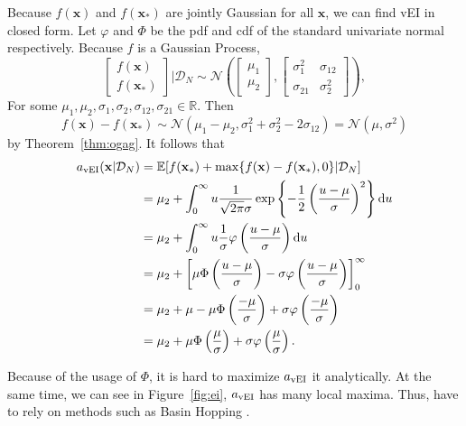 Because $f(\mathbf{x})$ and $f(\mathbf{x}_*)$ are jointly Gaussian for all $\mathbf{x}$, we can find vEI in closed form.
Let $\varphi$ and $\Phi$ be the pdf and cdf of the standard univariate normal respectively. 
Because $f$ is a Gaussian Process,
\begin{equation*}
    \begin{bmatrix}
        f(\mathbf{x}) \\
        f(\mathbf{x}_*)
    \end{bmatrix}
    \bigg| \mathcal{D}_N
    \sim \mathcal{N}\left(
    \begin{bmatrix}
            \mu_1 \\
            \mu_2
        \end{bmatrix}
    ,
    \begin{bmatrix}
            \sigma_{1}^2 & \sigma_{12} \\
            \sigma_{21} & \sigma^2_2
        \end{bmatrix}
    \right),
\end{equation*}
For some $\mu_1, \mu_2, \sigma_1, \sigma_2, \sigma_{12}, \sigma_{21} \in \mathbb{R}$.
Then
\begin{equation*}
    f(\mathbf{x}) - f\left(\mathbf{x}_*\right) \sim \mathcal{N}(\mu_1 - \mu_2, \sigma_1^2 + \sigma_2^2 - 2\sigma_{12})
    = \mathcal{N}\left(\mu, \sigma^2\right)
\end{equation*}
by Theorem~\ref{thm:ogag}.
It follows that
\begin{align*}
    a_{\mathrm{vEI}}(\mathbf{x} | \mathcal{D}_N)
    & =  \mathbb{E}[f(\mathbf{x}_*) + \max \{  f(\mathbf{x}) - f(\mathbf{x}_*), 0 \} | \mathcal{D}_N] \\
    & = \mu_2 + \int_{0}^\infty u \frac{ 1 }{ \sqrt{2 \pi } \sigma} \exp \left\{ -\frac12 \left(\frac{ u - \mu }{ \sigma }\right)^2 \right\} \mathrm{d} u \\
    & = \mu_2 + \int_{0}^\infty u \frac{ 1 }{ \sigma } \varphi\left(\frac{ u - \mu }{ \sigma }\right) \mathrm{d} u \\
    & = \mu_2 + \left[ \mu \Phi\left(\frac{ u - \mu }{ \sigma }\right) - \sigma \varphi\left(\frac{ u - \mu }{ \sigma }\right)\right]_{0}^{\infty} \\
    & = \mu_2 +  \mu - \mu \Phi\left(\frac{ -\mu }{ \sigma }\right) + \sigma \varphi\left(\frac{ -\mu }{ \sigma }\right) \\
    & = \mu_2 + \mu \Phi\left(\frac{ \mu }{ \sigma }\right) + \sigma \varphi\left(\frac{ \mu }{ \sigma }\right).
\end{align*}

Because of the usage of $\Phi$, it is hard to maximize $a_{\mathrm{vEI}}$ it analytically.
At the same time, we can see in Figure~\ref{fig:ei}, $a_{\mathrm{vEI}}$ has many local maxima.
Thus, have to rely on methods such as Basin Hopping \cite{wales1997}.
